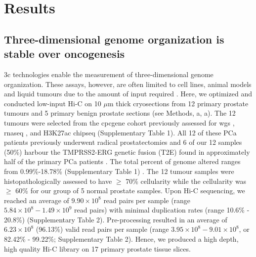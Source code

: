 \section{Results}

\subsection{Three-dimensional genome organization is stable over oncogenesis}

\Gls{3c} technologies enable the measurement of three-dimensional genome organization.
These assays, however, are often limited to cell lines, animal models and liquid tumours due to the amount of input required \cite{lieberman-aidenComprehensiveMappingLongRange2009}.
Here, we optimized and conducted low-input Hi-C \cite{diazChromatinConformationAnalysis2018} on 10 $\mu$m thick cryosections from 12 primary prostate tumours and 5 primary benign prostate sections (see Methods, a, a).
The 12 tumours were selected from the \gls{cpcgene} cohort previously assessed for \gls{wgs} \cite{fraserGenomicHallmarksLocalized2017}, \gls{rnaseq} \cite{chenWidespreadFunctionalRNA2019}, and H3K27ac \gls{chipseq} \cite{kronTMPRSS2ERGFusion2017,mazrooeiCistromePartitioningReveals2019} (Supplementary Table 1).
All 12 of these PCa patients previously underwent radical prostatectomies and 6 of our 12 samples (50\%) harbour the TMPRSS2-ERG genetic fusion (T2E) found in approximately half of the primary PCa patients \cite{fraserGenomicHallmarksLocalized2017}.
The total percent of genome altered ranges from 0.99\%-18.78\% (Supplementary Table 1) \cite{fraserGenomicHallmarksLocalized2017}.
The 12 tumour samples were histopathologically assessed to have $\ge$ 70\% cellularity while the cellularity was $\ge$ 60\% for our group of 5 normal prostate samples.
Upon Hi-C sequencing, we reached an average of $9.90 \times 10^8$  read pairs per sample (range $5.84 \times 10^8 - 1.49 \times 10^9$ read pairs) with minimal duplication rates (range 10.6\% - 20.8\%) (Supplementary Table 2).
Pre-processing resulted in an average of $6.23 \times 10^8$ (96.13\%) valid read pairs per sample (range $3.95 \times 10^8 - 9.01 \times 10^8$, or 82.42\% - 99.22\%; Supplementary Table 2).
Hence, we produced a high depth, high quality Hi-C library on 17 primary prostate tissue slices.


